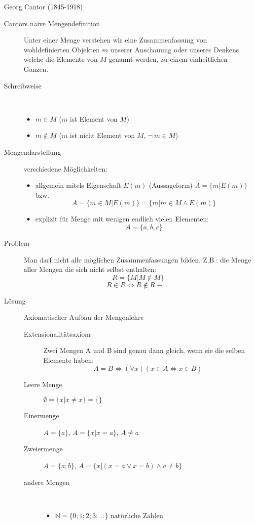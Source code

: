Georg Cantor (1845-1918)
\begin{description}
    \item[Cantors naive Mengendefinition] Unter einer Menge verstehen wir eine Zusammenfassung von wohldefinierten Objekten $m$ unserer Anschauung oder unseres Denkens welche die Elemente von $M$ genannt werden, zu einem einheitlichen Ganzen.
    \item[Schreibweise]\
    \begin{itemize}
        \item $m \in M$ ($m$ ist Element von $M$)
        \item $m \not\in M$ ($m$ ist nicht Element von $M$, $\neg\ m \in M$)
    \end{itemize}
    \item[Mengendarstellung] verschiedene Möglichkeiten:
    \begin{itemize}
        \item allgemein mitels Eigenschaft $E(m)$ (Aussageform) $A=\lbrace m|E(m) \rbrace$ bzw.
        \[A = \lbrace m \in M | E(m) \rbrace = \lbrace m | m \in M \wedge E(m) \rbrace\]
        \item explizit für Menge mit wenigen endlich vielen Elementen:
        \[A=\lbrace a, b, c\rbrace\]
    \end{itemize}
    \item[Problem] Man darf nicht alle möglichen Zusammenfassungen bilden. Z.B.: die Menge aller Mengen die sich nicht selbst enthalten:
    \[R=\lbrace M | M \not \in M \rbrace\]
    \[R \in R \Leftrightarrow R \not \in R \equiv \bot\]
    \item[Lösung] Axiomatischer Aufbau der Mengenlehre
    \begin{description}
        \item[Extensionalitätsaxiom] Zwei Mengen A und B sind genau dann gleich, wenn sie die selben Elemente haben:
        \[A = B \Leftrightarrow (\forall x)(x \in A \Leftrightarrow x \in B)\]
        \item[Leere Menge] $\emptyset = \lbrace x | x \not = x\rbrace = \lbrace\rbrace$
        \item[Einermenge] $A=\lbrace a \rbrace$, $A = \lbrace x | x = a \rbrace$, $A \not = a$
        \item[Zweiermenge] $A=\lbrace a; b \rbrace$, $A = \lbrace x|(x=a \vee x=b) \wedge a \not = b \rbrace$
        \item[andere Mengen] \
        \begin{itemize}
            \item $\mathbb{N} = \lbrace 0;1;2;3;\dots \rbrace$ natürliche Zahlen

\end{itemize}
\end{description}
\end{description}
